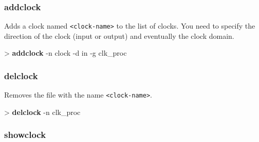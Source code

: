 \documentclass[10pt,a4paper]{article}
\begin{document}
\subsubsection{addclock}
\label{subsec:addclock}

Adds a clock named \texttt{<clock-name>} to the list of clocks. You need to specify the direction of the clock (input or output) and eventually the clock domain.\\


\begin{sampletitle}
> \textbf{\tool{} addclock} -n clock -d in -g clk\_proc
\end{sampletitle}


\subsubsection{delclock}
\label{subsec:delclock}

Removes the file with the name \texttt{<clock-name>}.\\


\begin{sampletitle}
> \textbf{\tool{} delclock} -n clk\_proc
\end{sampletitle}


\subsubsection{showclock}
\label{subsec:showclock}
\end{document}
